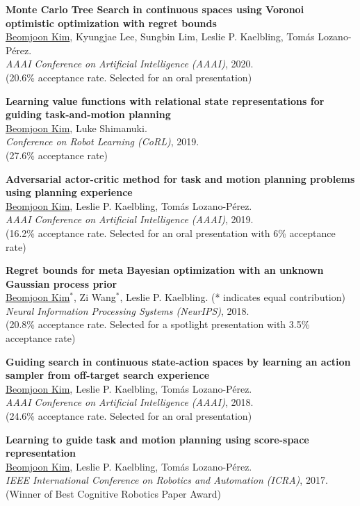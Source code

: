 \documentclass[line,margin,letterpaper]{res}
\begin{document}
\begin{resume}
\textbf{Monte Carlo Tree Search in continuous spaces using Voronoi optimistic optimization with regret bounds}\\
\underline{Beomjoon Kim}, Kyungjae Lee, Sungbin Lim, Leslie P. Kaelbling, Tom\'as Lozano-P\'erez.\\
{\sl AAAI Conference on Artificial Intelligence (AAAI)}, 2020. \\
{\small (20.6\% acceptance rate. Selected for an oral presentation)}

\textbf{Learning value functions with relational state representations for guiding task-and-motion planning}\\
\underline{Beomjoon Kim}, Luke Shimanuki.\\
{\sl Conference on Robot Learning (CoRL)}, 2019. \\
{\small (27.6\% acceptance rate)}

\textbf{Adversarial actor-critic method for task and motion planning problems using planning experience}\\
\underline{Beomjoon Kim}, Leslie P. Kaelbling, Tom\'as Lozano-P\'erez.\\
{\sl AAAI Conference on Artificial Intelligence (AAAI)}, 2019. \\
{\small (16.2\% acceptance rate. Selected for an oral presentation with 6\% acceptance rate)}

\textbf{Regret bounds for meta Bayesian optimization with an unknown Gaussian process prior}\\
\underline{Beomjoon Kim}$^*$, Zi Wang$^*$,  Leslie P. Kaelbling. {\small(* indicates equal contribution)}\\
{\sl Neural Information Processing Systems (NeurIPS)}, 2018.\\
{\small (20.8\% acceptance rate. Selected for a spotlight presentation with 3.5\% acceptance rate)}

\textbf{Guiding search in continuous state-action spaces by learning an action sampler from off-target search experience}\\
\underline{Beomjoon Kim}, Leslie P. Kaelbling, Tom\'as Lozano-P\'erez.\\
{\sl AAAI Conference on Artificial Intelligence (AAAI)}, 2018.\\
{\small (24.6\% acceptance rate. Selected for an oral presentation)}

\textbf{Learning to guide task and motion planning using score-space representation}\\
\underline{Beomjoon Kim}, Leslie P. Kaelbling, Tom\'as Lozano-P\'erez.\\
{\sl IEEE International Conference on Robotics and Automation (ICRA)}, 2017.\\
{\small({\color{red}Winner of Best Cognitive Robotics Paper Award})}



\end{resume}
\end{document}

